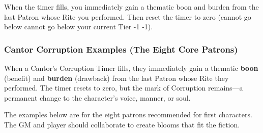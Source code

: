 When the timer fills, you immediately gain a thematic boon and burden from the last Patron whose Rite you performed. Then reset the timer to zero (cannot go below cannot go below your current Tier -1 -1).

\subsubsection{Cantor Corruption Examples (The Eight Core Patrons)}

When a Cantor's Corruption Timer fills, they immediately gain a thematic \textbf{boon} (benefit) and \textbf{burden} (drawback) from the last Patron whose Rite they performed. The timer resets to zero, but the mark of Corruption remains---a permanent change to the character's voice, manner, or soul.

The examples below are for the eight patrons recommended for first characters. The GM and player should collaborate to create blooms that fit the fiction.

